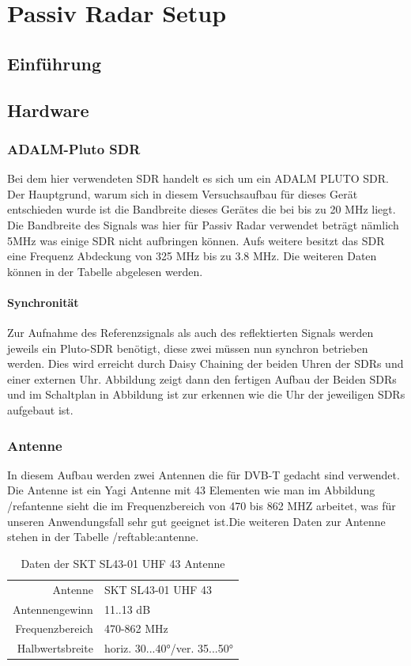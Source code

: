 \chapter{Passiv Radar Setup}
\section{Einführung}
\section{Hardware}
\subsection{ADALM-Pluto SDR}
Bei dem hier verwendeten SDR handelt es sich um ein ADALM
PLUTO SDR. Der Hauptgrund, warum sich in diesem Versuchsaufbau für dieses Gerät entschieden wurde ist die Bandbreite dieses Gerätes die bei bis zu 20 MHz liegt. Die Bandbreite des Signals was hier für Passiv Radar verwendet beträgt nämlich 5MHz was einige SDR nicht aufbringen können.  Aufs weitere besitzt das SDR eine Frequenz Abdeckung von 325 MHz bis zu 3.8 MHz. Die weiteren Daten können in der Tabelle abgelesen werden.

\subsubsection{Synchronität}
Zur Aufnahme des Referenzsignals als auch des reflektierten Signals werden jeweils ein Pluto-SDR benötigt, diese zwei müssen nun synchron betrieben werden. Dies wird erreicht durch Daisy Chaining  der beiden Uhren der SDRs und einer externen Uhr. Abbildung zeigt dann den fertigen Aufbau der Beiden SDRs und im Schaltplan in Abbildung ist zur erkennen wie die Uhr der jeweiligen SDRs aufgebaut ist.
\subsection{Antenne}
In diesem Aufbau werden zwei Antennen die für DVB-T gedacht sind verwendet. Die Antenne ist ein Yagi Antenne mit 43 Elementen wie man im Abbildung /ref{antenne} sieht die im Frequenzbereich von 470 bis 862 MHZ arbeitet, was für unseren Anwendungsfall sehr gut geeignet ist.Die weiteren Daten zur Antenne stehen in der Tabelle /ref{table:antenne}.

\begin{table}
    \centering
    \begin{tabular}[h]{rl}
        Antenne         & SKT SL43-01 UHF 43            \\
        Antennengewinn  & 11..13 dB                     \\
        Frequenzbereich & 470-862 MHz                   \\
        Halbwertsbreite & horiz. 30...40°/ver. 35...50° \\
    \end{tabular}
    \caption{Daten der SKT SL43-01 UHF 43 Antenne}\label{table:antenne}
\end{table}

